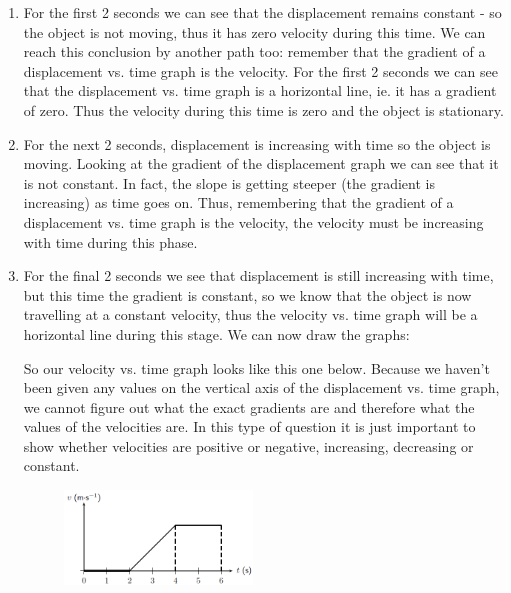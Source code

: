 {\begin{mdframed}[linewidth=4, leftmargin=40, rightmargin=40]
\begin{exercise}
\begin{enumerate}[noitemsep, label=\textbf{Step} \textbf{\arabic*}. ]
      \label{m38795*id73443}To answer these questions, break the motion up into three sections: 0 -- 2 seconds, 2 -- 4 seconds and 4 -- 6 seconds.\par 
      \item  
      \label{m38795*id73455}For the first 2 seconds we can see that the displacement remains constant - so the object is not moving, thus it has zero velocity during this time. We can reach this conclusion by another path too: remember that the gradient of a displacement vs. time graph is the velocity. For the first 2 seconds we can see that the displacement vs. time graph is a horizontal line, ie. it has a gradient of zero. Thus the velocity during this time is zero and the object is stationary.\par 
      \item  
      \label{m38795*id73469}For the next 2 seconds, displacement is increasing with time so the object is moving. Looking at the gradient of the displacement graph we can see that it is not constant. In fact, the slope is getting steeper (the gradient is increasing) as time goes on. Thus, remembering that the gradient of a displacement vs. time graph is the velocity, the velocity must be increasing with time during this phase.\par 
      \item  
      \label{m38795*id73483}For the final 2 seconds we see that displacement is still increasing with time, but this time the gradient is constant, so we know that the object is now travelling at a constant velocity, thus the velocity vs. time graph will be a horizontal line during this stage. We can now draw the graphs:\par 
      \label{m38795*id73489}So our velocity vs. time graph looks like this one below. Because we haven't been given any values on the vertical axis of the displacement vs. time graph, we cannot figure out what the exact gradients are and therefore what the values of the velocities are. In this type of question it is just important to show whether velocities are positive or negative, increasing, decreasing or constant.\par 
      \label{m38795*id73495}
        
    \setcounter{subfigure}{0}


	\begin{figure}[H] %
    \begin{center}
    \label{m38795*id73499!!!underscore!!!media}\label{m38795*id73499!!!underscore!!!printimage}\includegraphics[width=5cm]{col11305.imgs/m38795_PG10C2_039.png} %
        

\end{center}
\end{figure}
\end{enumerate}
\end{exercise}
\end{mdframed}}
